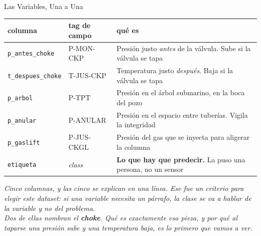 \documentclass[aspectratio=169, 11pt]{beamer}
\begin{document}
\begin{frame}[shrink=18]{Las Variables, Una a Una}
  \vspace{-4pt}
  {\footnotesize
  \renewcommand{\arraystretch}{1.2}
  \begin{tabular}{@{}p{3.1cm}p{2.5cm}p{9.1cm}@{}}
    \toprule
    {\color{arcaDark}\bfseries columna} &
    {\color{arcaDark}\bfseries tag de campo} &
    {\color{arcaDark}\bfseries qué es} \\
    \midrule
    \texttt{p\_antes\_choke} & P-MON-CKP &
      Presión justo \emph{antes} de la válvula. Sube si la válvula se tapa \\
    \texttt{t\_despues\_choke} & T-JUS-CKP &
      Temperatura justo \emph{después}. Baja si la válvula se tapa \\
    \texttt{p\_arbol} & P-TPT &
      Presión en el árbol submarino, en la boca del pozo \\
    \texttt{p\_anular} & P-ANULAR &
      Presión en el espacio entre tuberías. Vigila la integridad \\
    \texttt{p\_gaslift} & P-JUS-CKGL &
      Presión del gas que se inyecta para aligerar la columna \\
    \midrule
    \rowcolor{arcaGray}
    \texttt{etiqueta} & \emph{class} &
      {\color{arcaRed}\bfseries Lo que hay que predecir.} La puso una persona,
      no un sensor \\
    \bottomrule
  \end{tabular}}
  \vspace{8pt}

  {\scriptsize\color{textMuted}\itshape
   Cinco columnas, y las cinco se explican en una línea. Ese fue un criterio
   para elegir este dataset: si una variable necesita un párrafo, la clase
   se va a hablar de la variable y no del problema.\\[4pt]
   {\color{arcaDark}Dos de ellas nombran el \textbf{choke}. Qué es exactamente
   esa pieza, y por qué al taparse una presión sube y una temperatura baja,
   es lo primero que vamos a ver.}}
\end{frame}
\end{document}
